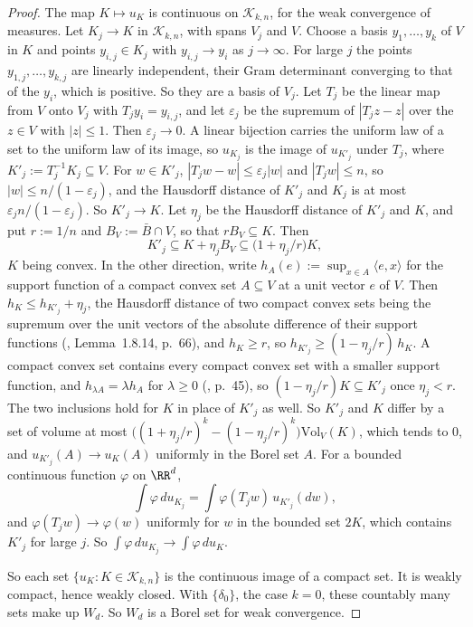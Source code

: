 \begin{proof}
The map $K \mapsto u_K$ is continuous on $\mathcal{K}_{k,n}$, for the weak convergence of measures.
Let $K_j \to K$ in $\mathcal{K}_{k,n}$, with spans $V_j$ and $V$. Choose a basis $y_1,\dots,y_k$ of
$V$ in $K$ and points $y_{i,j} \in K_j$ with $y_{i,j} \to y_i$ as $j \to \infty$. For large $j$
the points $y_{1,j},\dots,y_{k,j}$ are linearly independent, their Gram determinant converging to
that of the $y_i$, which is positive. So they are a basis of $V_j$. Let $T_j$ be the linear map
from $V$ onto $V_j$ with $T_jy_i = y_{i,j}$, and let $\varepsilon_j$ be the supremum of $|T_jz - z|$
over the $z \in V$ with $|z| \le 1$. Then $\varepsilon_j \to 0$. A linear bijection carries the
uniform law of a set to the uniform law of its image, so $u_{K_j}$ is the image of $u_{K'_j}$ under
$T_j$, where $K'_j := T_j^{-1}K_j \subseteq V$. For $w \in K'_j$, $|T_jw - w| \le \varepsilon_j|w|$
and $|T_jw| \le n$, so $|w| \le n/(1-\varepsilon_j)$, and the Hausdorff distance of $K'_j$ and $K_j$
is at most $\varepsilon_jn/(1-\varepsilon_j)$. So $K'_j \to K$. Let $\eta_j$ be the Hausdorff
distance of $K'_j$ and $K$, and put $r := 1/n$ and $B_V := \bar B \cap V$, so that
$rB_V \subseteq K$. Then
\[
  K'_j \subseteq K + \eta_jB_V \subseteq \bigl(1 + \eta_j/r\bigr)K ,
\]
$K$ being convex. In the other direction, write $h_A(e) := \sup_{x \in A}\langle e,x\rangle$ for the
support function of a compact convex set $A \subseteq V$ at a unit vector $e$ of $V$. Then
$h_K \le h_{K'_j} + \eta_j$, the Hausdorff distance of two compact convex sets being the supremum
over the unit vectors of the absolute difference of their support functions
(, Lemma~1.8.14, p.~66), and $h_K \ge r$, so
$h_{K'_j} \ge (1 - \eta_j/r)\,h_K$. A compact
convex set contains every compact convex set with a smaller support function, and
$h_{\lambda A} = \lambda h_A$ for $\lambda \ge 0$ (, p.~45), so
$(1 - \eta_j/r)K \subseteq K'_j$ once $\eta_j < r$. The two inclusions hold for $K$ in place of
$K'_j$ as well. So $K'_j$ and $K$ differ by a set of volume at most
$\bigl((1+\eta_j/r)^k - (1-\eta_j/r)^k\bigr)\mathrm{Vol}_V(K)$, which tends to $0$, and
$u_{K'_j}(A) \to u_K(A)$ uniformly in the Borel set $A$. For a bounded continuous function
$\varphi$ on $\RR^d$,
\[
  \int\varphi\,du_{K_j} = \int\varphi(T_jw)\,u_{K'_j}(dw) ,
\]
and $\varphi(T_jw) \to \varphi(w)$ uniformly for $w$ in the bounded set $2K$, which contains $K'_j$
for large $j$. So $\int\varphi\,du_{K_j} \to \int\varphi\,du_K$.

So each set $\{u_K : K \in \mathcal{K}_{k,n}\}$ is the continuous image of a compact set. It is
weakly compact, hence weakly closed. With $\{\delta_0\}$, the case $k = 0$, these countably many
sets make up $W_d$. So $W_d$ is a Borel set for weak convergence.


\end{proof}
